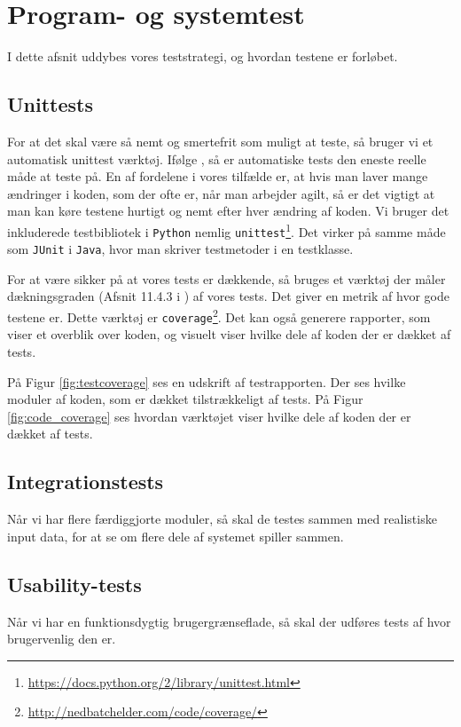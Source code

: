 \documentclass[11pt, a4paper]{article}
\begin{document}
\section{Program- og systemtest}
\label{sec:program_og_systemtest}
I dette afsnit uddybes vores teststrategi, og hvordan testene er forløbet.
\subsection{Unittests}
\label{sub:unittests}
For at det skal være så nemt og smertefrit som muligt at teste, så bruger vi et automatisk unittest værktøj. Ifølge \cite{COCO}, så er automatiske tests den eneste reelle måde at teste på. En af fordelene i vores tilfælde er, at hvis man laver mange ændringer i koden, som der ofte er, når man arbejder agilt, så er det vigtigt at man kan køre testene hurtigt og nemt efter hver ændring af koden. Vi bruger det inkluderede testbibliotek i \verb!Python! nemlig \verb!unittest!\footnote{\url{https://docs.python.org/2/library/unittest.html}}. Det virker på samme måde som \verb!JUnit! i \verb!Java!, hvor man skriver testmetoder i en testklasse.

For at være sikker på at vores tests er dækkende, så bruges et værktøj der måler dækningsgraden (Afsnit 11.4.3 i \cite{OOSE})  af vores tests. Det giver en metrik af hvor gode testene er. Dette værktøj er \verb!coverage!\footnote{\url{http://nedbatchelder.com/code/coverage/}}. Det kan også generere rapporter, som viser et overblik over koden, og visuelt viser hvilke dele af koden der er dækket af tests.

På Figur \ref{fig:testcoverage} ses en udskrift af testrapporten. Der ses hvilke moduler af koden, som er dækket tilstrækkeligt af tests. På Figur \ref{fig:code_coverage} ses hvordan værktøjet viser hvilke dele af koden der er dækket af tests.

\subsection{Integrationstests}
\label{sub:integrationstests}
Når vi har flere færdiggjorte moduler, så skal de testes sammen med realistiske input data, for at se om flere dele af systemet spiller sammen.

\subsection{Usability-tests}
\label{sub:usability_tests}
Når vi har en funktionsdygtig brugergrænseflade, så skal der udføres tests af hvor brugervenlig den er.
\end{document}
